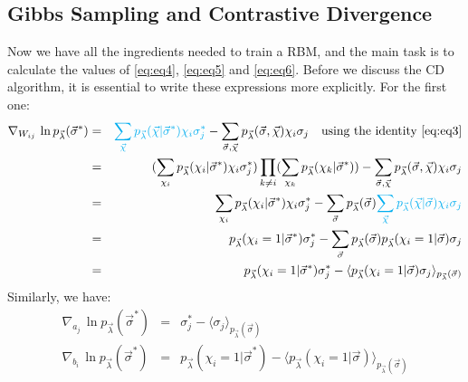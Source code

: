 \documentclass[letterpaper, 10pt]{article}
\newcommand{\qbar}{\rangle}
\newcommand{\qket}{\langle}
\begin{document}
\subsection{Gibbs Sampling and Contrastive Divergence}
Now we have all the ingredients needed to train a RBM, and the main task is to calculate the values of \ref{eq:eq4}, \ref{eq:eq5} and \ref{eq:eq6}. Before we discuss the CD algorithm, it is essential to write these expressions more explicitly. For the first one:
\begin{eqnarray}
\nabla_{W_{ij}} \, \ln{p_{\vec{\lambda}}(\vec{\sigma}^*)} & = & {\color{cyan}{\sum_{\vec{\chi}} p_{\vec{\lambda}}(\vec{\chi} | \vec{\sigma}^*) \chi_i \sigma_j^*}} - \sum_{\vec{\sigma},\vec{\chi}} p_{\vec{\lambda}}(\vec{\sigma},\vec{\chi}) \chi_i \sigma_j \quad{} \textrm{using the identity}\,\, \ref{eq:eq3} \nonumber\\
	& = & ( \sum_{\chi_i} p_{\vec{\lambda}}(\chi_i | \vec{\sigma}^*) \chi_i \sigma_j^* ) \prod_{k \neq i} (\sum_{\chi_k} p_{\vec{\lambda}}(\chi_k | \vec{\sigma}^*)) - \sum_{\vec{\sigma},\vec{\chi}} p_{\vec{\lambda}}(\vec{\sigma},\vec{\chi}) \chi_i \sigma_j  \nonumber\\
	& = & \sum_{\chi_i} p_{\vec{\lambda}}(\chi_i | \vec{\sigma}^*) \chi_i \sigma_j^* - \sum_{\vec{\sigma}} p_{\vec{\lambda}}(\vec{\sigma}) {\color{cyan}{\sum_{\vec{\chi}} p_{\vec{\lambda}}(\vec{\chi} | \vec{\sigma}) \chi_i \sigma_j}} \nonumber\\
	& = & p_{\vec{\lambda}}(\chi_i=1 | \vec{\sigma}^*) \sigma_j^* - \sum_{\vec{\sigma}} p_{\vec{\lambda}}(\vec{\sigma}) p_{\vec{\lambda}}(\chi_i=1 | \vec{\sigma}) \sigma_j \nonumber\\
	& = & p_{\vec{\lambda}}(\chi_i=1 | \vec{\sigma}^*) \sigma_j^* - \qket p_{\vec{\lambda}}(\chi_i=1 | \vec{\sigma}) \sigma_j \qbar_{p_{\vec{\lambda}}(\vec{\sigma})}\label{eq:eq7}
\end{eqnarray}
Similarly, we have:
\begin{eqnarray}
\nabla_{a_j} \, \ln{p_{\vec{\lambda}}(\vec{\sigma}^*)} & = & \sigma_j^* - \qket \sigma_j \qbar_{p_{\vec{\lambda}}(\vec{\sigma})}\label{eq:eq8} \\
\nabla_{b_i} \, \ln{p_{\vec{\lambda}}(\vec{\sigma}^*)} & = & p_{\vec{\lambda}}(\chi_i=1 | \vec{\sigma}^*) - \qket p_{\vec{\lambda}}(\chi_i=1 | \vec{\sigma})\qbar_{p_{\vec{\lambda}}(\vec{\sigma})}\label{eq:eq9}
\end{eqnarray}
\end{document}

